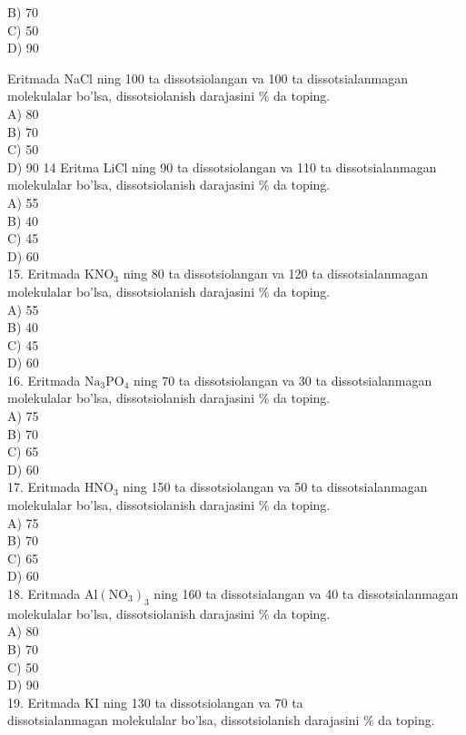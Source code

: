 B) 70\\
C) 50\\
D) 90
  \item Eritmada NaCl ning 100 ta dissotsiolangan va 100 ta dissotsialanmagan molekulalar bo'lsa, dissotsiolanish darajasini \% da toping.\\
A) 80\\
B) 70\\
C) 50\\
D) 90
14 Eritma LiCl ning 90 ta dissotsiolangan va 110 ta dissotsialanmagan molekulalar bo'lsa, dissotsiolanish darajasini \% da toping.\\
A) 55\\
B) 40\\
C) 45\\
D) 60\\
15. Eritmada $\mathrm{KNO}_{3}$ ning 80 ta dissotsiolangan va 120 ta dissotsialanmagan molekulalar bo'lsa, dissotsiolanish darajasini \% da toping.\\
A) 55\\
B) 40\\
C) 45\\
D) 60\\
16. Eritmada $\mathrm{Na}_{3} \mathrm{PO}_{4}$ ning 70 ta dissotsiolangan va 30 ta dissotsialanmagan molekulalar bo'lsa, dissotsiolanish darajasini \% da toping.\\
A) 75\\
B) 70\\
C) 65\\
D) 60\\
17. Eritmada $\mathrm{HNO}_{3}$ ning 150 ta dissotsiolangan va 50 ta dissotsialanmagan molekulalar bo'lsa, dissotsiolanish darajasini \% da toping.\\
A) 75\\
B) 70\\
C) 65\\
D) 60\\
18. Eritmada $\mathrm{Al}\left(\mathrm{NO}_{3}\right)_{3}$ ning 160 ta dissotsialangan va 40 ta dissotsialanmagan molekulalar bo'lsa, dissotsiolanish darajasini \% da toping.\\
A) 80\\
B) 70\\
C) 50\\
D) 90\\
19. Eritmada KI ning 130 ta dissotsiolangan va 70 ta\\
dissotsialanmagan molekulalar bo'lsa, dissotsiolanish darajasini \% da toping.\\
